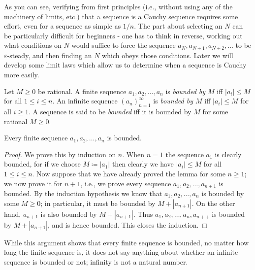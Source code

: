 \begin{note}
As you can see, verifying from first principles (i.e., without using any of the machinery of limits, etc.) that a sequence is a Cauchy sequence requires some effort, even for a sequence as simple as \(1 / n\).
The part about selecting an \(N\) can be particularly difficult for beginners
- one has to think in reverse, working out what conditions on \(N\) would suffice to force the sequence \(a_N, a_{N + 1}, a_{N + 2}, \dots\) to be \(\varepsilon\)-steady, and then finding an \(N\) which obeys those conditions.
Later we will develop some limit laws which allow us to determine when a sequence is Cauchy more easily.
\end{note}

\begin{definition}\label{5.1.12}
Let \(M \geq 0\) be rational.
A finite sequence \(a_1, a_2, \dots, a_n\) is \emph{bounded by \(M\)} iff \(|a_i| \leq M\) for all \(1 \leq i \leq n\).
An infinite sequence \((a_n)_{n = 1}^{\infty}\) is \emph{bounded by \(M\)} iff \(|a_i| \leq M\) for all \(i \geq 1\).
A sequence is said to be \emph{bounded} iff it is bounded by \(M\) for some rational \(M \geq 0\).
\end{definition}

\setcounter{theorem}{13}
\begin{lemma}\label{5.1.14}
Every finite sequence \(a_1, a_2, \dots, a_n\) is bounded.
\end{lemma}

\begin{proof}
We prove this by induction on \(n\).
When \(n = 1\) the sequence \(a_1\) is clearly bounded, for if we choose \(M \coloneqq |a_1|\) then clearly we have \(|a_i| \leq M\) for all \(1 \leq i \leq n\).
Now suppose that we have already proved the lemma for some \(n \geq 1\);
we now prove it for \(n + 1\), i.e., we prove every sequence \(a_1, a_2, \dots, a_{n + 1}\) is bounded.
By the induction hypothesis we know that \(a_1, a_2, \dots, a_n\) is bounded by some \(M \geq 0\);
in particular, it must be bounded by \(M + |a_{n + 1}|\).
On the other hand, \(a_{n + 1}\) is also bounded by \(M + |a_{n + 1}|\).
Thus \(a_1, a_2, \dots, a_n, a_{n++}\) is bounded by \(M + |a_{n + 1}|\), and is hence bounded.
This closes the induction.
\end{proof}

\begin{note}
While this argument shows that every finite sequence is bounded, no matter how long the finite sequence is, it does not say anything about whether an infinite sequence is bounded or not;
infinity is not a natural number.
\end{note}

